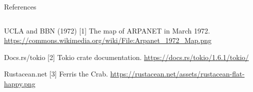 \begin{frame}{References}
    \begin{columns}[c]


        \footnotesize {
            \begin{thebibliography}{9}

                 UCLA and BBN (1972) [1]
                \newblock The map of ARPANET in March 1972.
                \newblock \url{https://commons.wikimedia.org/wiki/File:Arpanet_1972_Map.png}

                 Docs.rs/tokio [2]
                \newblock Tokio crate documentation.
                \newblock \url{https://docs.rs/tokio/1.6.1/tokio/}

                 Rustacean.net [3]
                \newblock Ferris the Crab.
                \newblock \url{https://rustacean.net/assets/rustacean-flat-happy.png}

            \end{thebibliography}
        }


    \end{columns}
\end{frame}
